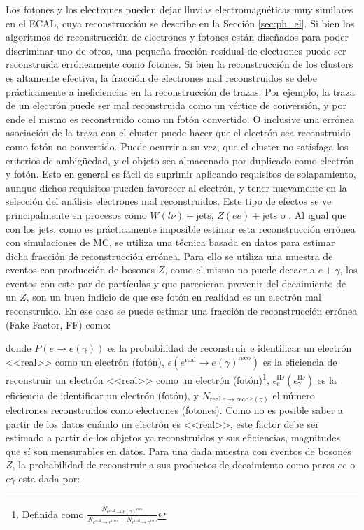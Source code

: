Los fotones y los electrones pueden dejar lluvias electromagnéticas muy
similares en el ECAL, cuya reconstrucción se describe en la Sección \ref{sec:ph_el}.
Si bien los algoritmos de reconstrucción de electrones y fotones están diseñados para poder discriminar uno de otros, una pequeña fracción residual de electrones puede ser reconstruida erróneamente como fotones. Si bien la reconstrucción de los clusters es altamente efectiva, la fracción de electrones mal reconstruidos se debe prácticamente a ineficiencias en la reconstrucción de trazas. Por ejemplo, la traza de un electrón puede ser mal reconstruida como un vértice de conversión, y por ende el mismo es reconstruido como un fotón convertido. O inclusive una errónea asociación de la traza con el cluster puede hacer que el electrón sea reconstruido como fotón no convertido.
Puede ocurrir a su vez, que el cluster no satisfaga los criterios de ambigüedad, y el objeto sea almacenado por duplicado como electrón y fotón. Esto en general es fácil de suprimir aplicando requisitos de solapamiento, aunque dichos requisitos pueden favorecer al electrón, y tener nuevamente en la selección del análisis electrones mal reconstruidos. Este tipo de efectos se ve principalmente en procesos como $W(l\nu)+\text{jets}$, $Z(ee)+\text{jets}$ o \ttbar. Al igual que con los jets, como es prácticamente imposible estimar esta reconstrucción errónea con simulaciones de MC, se utiliza una técnica basada en datos para estimar dicha fracción de reconstrucción errónea. Para ello se utiliza una muestra de eventos con producción de bosones $Z$, como el mismo no puede decaer a $e+\gamma$, los eventos con este par de partículas y que parecieran provenir del decaimiento de un $Z$, son un buen indicio de que ese fotón en realidad es un electrón mal reconstruido. En ese caso se puede estimar una fracción de reconstrucción errónea (Fake Factor, FF) como:



donde $P(e\to e(\gamma))$ es la probabilidad de reconstruir e identificar un electrón <<real>> como un electrón (fotón), $\epsilon(e^{\text{real}}\to e(\gamma)^{\text{reco}})$ es la eficiencia de reconstruir un electrón <<real>> como un electrón (fotón)\footnote{Definida como $\frac{N_{e^{\text{real}}\to e(\gamma)^{\text{reco}}}}{N_{e^{\text{real}}\to e^{\text{reco}}}+N_{e^{\text{real}}\to \gamma^{\text{reco}}}}$}, $\epsilon^{\text{ID}}_{e} (\epsilon^{\text{ID}}_{\gamma})$ es la eficiencia de identificar un electrón (fotón), y $N_{\text{real}\ e\to \text{reco}\ e(\gamma)}$ el número electrones reconstruidos como electrones (fotones). Como no es posible saber a partir de los datos cuándo un electrón es <<real>>, este factor debe ser estimado a partir de los objetos ya reconstruidos y sus eficiencias, magnitudes que sí son mensurables en datos. Para una dada muestra con eventos de bosones $Z$, la probabilidad de reconstruir a sus productos de decaimiento como pares $ee$ o $e\gamma$ esta dada por:



